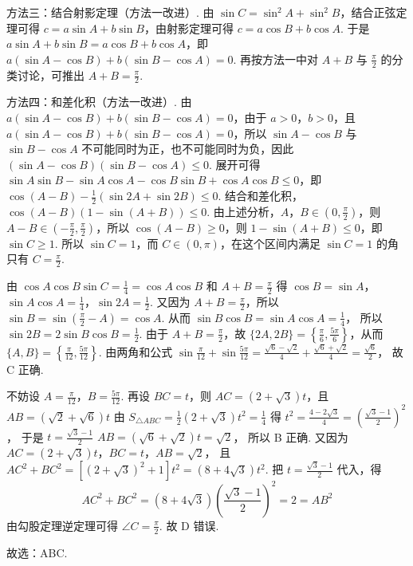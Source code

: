 \documentclass[UTF8,a4paper,oneside,11pt]{ctexbook}
\begin{document}
\begin{solution}
方法三：结合射影定理（方法一改进）. 由 \(\sin C = \sin^2 A + \sin^2 B\)，结合正弦定理可得 \(c = a \sin A + b \sin B\)，由射影定理可得 \(c = a \cos B + b \cos A\). 于是 \(a \sin A + b \sin B = a \cos B + b \cos A\)，即 \(a(\sin A - \cos B) + b(\sin B - \cos A) = 0\). 再按方法一中对 \(A+B\) 与 \(\frac{\pi}{2}\) 的分类讨论，可推出 \(A + B = \frac{\pi}{2}\).

方法四：和差化积（方法一改进）. 由 \(a(\sin A - \cos B) + b(\sin B - \cos A) = 0\)，由于 \(a>0\)，\(b>0\)，且 \(a(\sin A-\cos B)+b(\sin B-\cos A)=0\)，所以 \(\sin A-\cos B\) 与 \(\sin B-\cos A\) 不可能同时为正，也不可能同时为负，因此 \((\sin A - \cos B)(\sin B - \cos A) \le 0\). 展开可得 \(\sin A \sin B - \sin A \cos A - \cos B \sin B + \cos A \cos B \le 0\)，即 \(\cos (A - B) - \frac{1}{2}(\sin 2A + \sin 2B) \le 0\). 结合和差化积，\(\cos (A - B)(1 - \sin (A + B)) \le 0\). 由上述分析，\(A\)，\(B \in \left(0,\frac{\pi}{2}\right)\)，则 \(A - B \in (-\frac{\pi}{2},\frac{\pi}{2})\)，所以 \(\cos (A - B) \ge 0\)，则 \(1 - \sin (A + B) \le 0\)，即 \(\sin C \ge 1\). 所以 \(\sin C = 1\)，而 \(C\in(0,\pi)\)，在这个区间内满足 \(\sin C=1\) 的角只有 \(C=\frac{\pi}{2}\).

由
\(\cos A \cos B \sin C = \frac{1}{4} = \cos A \cos B\)
和
\(A + B = \frac{\pi}{2}\)
得
\(\cos B=\sin A\)，\(\sin A \cos A=\frac{1}{4}\)，\(\sin 2A=\frac{1}{2}\).
又因为 \(A+B=\frac{\pi}{2}\)，所以
\(\sin B=\sin\left(\frac{\pi}{2}-A\right)=\cos A\).
从而
\(\sin B\cos B=\sin A\cos A=\frac{1}{4}\)，
所以
\(\sin 2B=2\sin B\cos B=\frac{1}{2}\).
由于 \(A+B=\frac{\pi}{2}\)，故
\(\{2A,2B\}=\left\{\frac{\pi}{6},\frac{5\pi}{6}\right\}\)，从而
\(\{A,B\}=\left\{\frac{\pi}{12},\frac{5\pi}{12}\right\}\).
由两角和公式
\(
\sin \frac{\pi}{12} + \sin \frac{5\pi}{12} = \frac{\sqrt{6} - \sqrt{2}}{4} + \frac{\sqrt{6} + \sqrt{2}}{4} = \frac{\sqrt{6}}{2}
\)，
故 C 正确.

不妨设 \(A=\frac{\pi}{12}\)，\(B=\frac{5\pi}{12}\). 再设 \(BC = t\)，则 \(AC = (2 + \sqrt{3})t\)，且
\(AB = (\sqrt{2} + \sqrt{6})t\)
由
\(S_{\triangle ABC} = \frac{1}{2}(2 + \sqrt{3})t^2 = \frac{1}{4}\)
得
\(
t^2=\frac{4 - 2\sqrt{3}}{4}=\left(\frac{\sqrt{3} - 1}{2}\right)^2
\)，
于是
\(t = \frac{\sqrt{3} - 1}{2}\)
\(AB = (\sqrt{6} + \sqrt{2})t = \sqrt{2}\)，
所以 B 正确. 又因为
\(AC=(2+\sqrt{3})t\)，\(BC=t\)，\(AB=\sqrt{2}\)，
且
\(AC^2+BC^2=\left[(2+\sqrt{3})^2+1\right]t^2=(8+4\sqrt{3})t^2\).
把 \(t=\frac{\sqrt{3}-1}{2}\) 代入，得
\[
AC^2+BC^2=(8+4\sqrt{3})\left(\frac{\sqrt{3}-1}{2}\right)^2=2=AB^2
\]
由勾股定理逆定理可得
\(\angle C=\frac{\pi}{2}\).
故 D 错误.


故选：ABC.
\end{solution}
\end{document}
